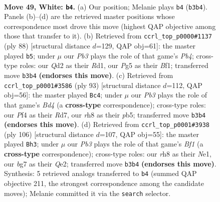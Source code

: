 \documentclass[11pt]{article}
\begin{document}
\clearpage

\begin{figure}[p]\centering
\begin{subfigure}{0.46\textwidth}\centering
\resizebox{\linewidth}{!}{%
\newchessgame
\chessboard[
  setfen={rn1qk2r/4n1b1/2p3p1/3p2P1/3P1P1p/1PR4P/2NQBK2/2B4R w - - 27 49},
  showmover=false,
  pgfstyle=straightmove, color=movearrow, markmove={b3-b4}
]}
\caption{}
\end{subfigure}\hfill
\begin{subfigure}{0.46\textwidth}\centering
\resizebox{\linewidth}{!}{%
\newchessgame
\chessboard[
  setfen={1r2q1k1/2r1bpp1/1p1ppn1p/8/1P1NPn2/1Q4RP/1B3PP1/3R1BK1 w - - 4 45},
  showmover=false,
  pgfstyle=straightmove, color=movearrow, markmove={b4-b5}
]}
\caption{}
\end{subfigure}
\\[4pt]
\begin{subfigure}{0.46\textwidth}\centering
\resizebox{\linewidth}{!}{%
\newchessgame
\chessboard[
  setfen={8/2pr1n1k/1p2q3/1P1b1r1p/NR2p1pP/2B1P1P1/2Q2P2/2R3K1 b - - 13 47},
  showmover=false,
  pgfstyle=straightmove, color=movearrow, markmove={d5-c4}
]}
\caption{}
\end{subfigure}\hfill
\begin{subfigure}{0.46\textwidth}\centering
\resizebox{\linewidth}{!}{%
\newchessgame
\chessboard[
  setfen={b1q1r1k1/3n1pp1/1p5p/1Pn1p3/2P4P/R5P1/1B2QP2/4NBK1 w - - 7 54},
  showmover=false,
  pgfstyle=straightmove, color=movearrow, markmove={f1-h3}
]}
\caption{}
\end{subfigure}
\caption{\textbf{Move 49, White: \texttt{b4}.} (a) Our position; Melanie plays \texttt{b4} (\texttt{b3b4}). Panels (b)--(d) are the retrieved master positions whose correspondence most drove this move (highest QAP objective among those that transfer to it). (b) Retrieved from \texttt{ccrl\_top\_p0000\#1137} (ply 88) [structural distance $d$=129, QAP obj=61]: the master played \texttt{b5}; under $\mu$ our \emph{Pb3} plays the role of that game's \emph{Pb4}; cross-type roles: our \emph{Q}d2 as their \emph{R}d1, our \emph{P}g5 as their \emph{B}f1; transferred move \texttt{b3b4} \textbf{(endorses this move)}. (c) Retrieved from \texttt{ccrl\_top\_p0001\#3586} (ply 93) [structural distance $d$=112, QAP obj=56]: the master played \texttt{Bc4}; under $\mu$ our \emph{Pb3} plays the role of that game's \emph{Bd4} (a \textbf{cross-type} correspondence); cross-type roles: our \emph{P}f4 as their \emph{R}d7, our \emph{r}h8 as their \emph{p}b5; transferred move \texttt{b3b4} \textbf{(endorses this move)}. (d) Retrieved from \texttt{ccrl\_top\_p0001\#3938} (ply 106) [structural distance $d$=107, QAP obj=55]: the master played \texttt{Bh3}; under $\mu$ our \emph{Pb3} plays the role of that game's \emph{Bf1} (a \textbf{cross-type} correspondence); cross-type roles: our \emph{r}h8 as their \emph{N}e1, our \emph{b}g7 as their \emph{Q}e2; transferred move \texttt{b3b4} \textbf{(endorses this move)}. Synthesis: 5 retrieved analogs transferred to \texttt{b4} (summed QAP objective 211, the strongest correspondence among the candidate moves); Melanie committed it via the \texttt{search} selector.}
\label{fig:thought-m96}
\end{figure}
\end{document}
